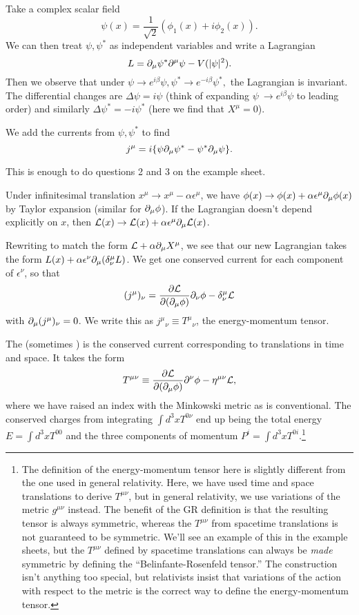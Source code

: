 \begin{exm}
Take a complex scalar field $$\psi(x)=\frac{1}{\sqrt{2}}(\phi_1(x)+i\phi_2(x)).$$ We can then treat $\psi, \psi^*$ as independent variables and write a Lagrangian
$$L=\partial_\mu \psi^* \partial^\mu \psi - V(|\psi|^2).$$
Then we observe that under $\psi\to e^{i\beta}\psi, \psi^* \to e^{-i\beta}\psi^*,$ the Lagrangian is invariant. The differential changes are $\Delta \psi = i \psi$ (think of expanding $\psi\ \to e^{i\beta}\psi$ to leading order) and similarly $\Delta \psi^*=-i\psi^*$ (here we find that $X^\mu=0$).

We add the currents from $\psi, \psi^*$ to find
$$j^\mu = i\{ \psi \partial_\mu \psi^* - \psi^* \partial_\mu \psi\}.$$
\end{exm}
This is enough to do questions 2 and 3 on the example sheet.
\begin{exm}
Under infinitesimal translation $x^\mu \to x^\mu -\alpha \epsilon^\mu$, we have $\phi(x)\to \phi(x)+\alpha \epsilon^\mu \partial_\mu \phi(x)$ by Taylor expansion (similar for $\partial_\mu\phi$). If the Lagrangian doesn't depend explicitly on $x$, then $\mathcal L(x)\to \mathcal L(x) +\alpha \epsilon^\mu \partial_\mu \mathcal L(x)$.

Rewriting to match the form $\mathcal L+\alpha \partial_\mu X^\mu$, we see that our new Lagrangian takes the form
$L(x)+\alpha \epsilon^\nu \partial_\mu (\delta^\mu_\nu L)$. We get one conserved current for each component of $\epsilon^\nu$, so that
$$(j^\mu)_\nu = \frac{\partial \mathcal L}{\partial (\partial_\mu \phi)}\partial_\nu \phi - \delta^\mu_\nu \mathcal L$$ with $\partial_\mu(j^\mu)_\nu=0$.
We write this as $j^\mu{}_\nu \equiv T^\mu{}_\nu$, the energy-momentum tensor. 

\begin{defn}
The  (sometimes ) is the conserved current corresponding to translations in time and space. It takes the form 
$$T^{\mu\nu} \equiv \frac{\partial \mathcal L}{\partial (\partial_\mu \phi)}\partial^\nu \phi - \eta^{\mu\nu} \mathcal L,$$
where we have raised an index with the Minkowski metric as is conventional. The conserved charges from integrating $\int d^3x T^{0\nu}$ end up being the total energy $E=\int d^3x T^{00}$ and the three components of momentum $P^i=\int d^3x T^{0i}$.\footnote{The definition of the energy-momentum tensor here is slightly different from the one used in general relativity. Here, we have used time and space translations to derive $T^{\mu\nu}$, but in general relativity, we use variations of the metric $g^{\mu\nu}$ instead. The benefit of the GR definition is that the resulting tensor is always symmetric, whereas the $T^{\mu\nu}$ from spacetime translations is not guaranteed to be symmetric. We'll see an example of this in the example sheets, but the $T^{\mu\nu}$ defined by spacetime translations can always be \emph{made} symmetric by defining the ``Belinfante-Rosenfeld tensor.'' The construction isn't anything too special, but relativists insist that variations of the action with respect to the metric is the correct way to define the energy-momentum tensor.}
\end{defn}
\end{exm}